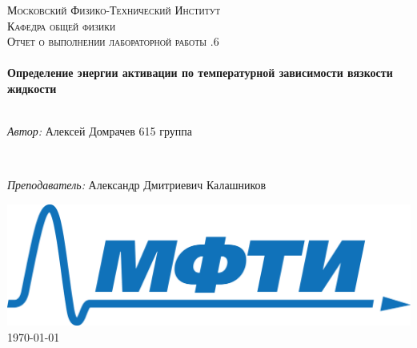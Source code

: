 
	\begin{titlepage}
		
		
		
		\center %
		
		
		
		
		\textsc{\LARGE Московский Физико-Технический Институт}\\[1,5cm] %
		\textsc{\Large Кафедра общей физики}\\[0.5cm]
		\textsc{\large Отчет о выполнении лабораторной работы .6}\\[0.5cm] %
		
		
		\HRule
		\\[0.4cm]
		{ \huge \bfseries Определение энергии активации по температурной зависимости вязкости жидкости}
		\\[0.2cm] %
		\HRule
		\\[1.5cm]
		
		
		
		
		\begin{minipage}{0.7\textwidth}
			\begin{center} \large
				\emph{Автор:} Алексей \textsf{Домрачев} 615 группа
			\end{center}
		\end{minipage}
		\\[1.0cm]
		\begin{minipage}{0.9\textwidth}
			\begin{center} \large
				\emph{Преподаватель:} Александр Дмитриевич \textsf{Калашников} %
			\end{center}
		\end{minipage}
		
		\begin{bottompar}
			\includegraphics[width = 80 mm]{logo.png}	\\[1,0cm]
			{\large \today}
		\end{bottompar}
		\vfill %
		
	\end{titlepage}

